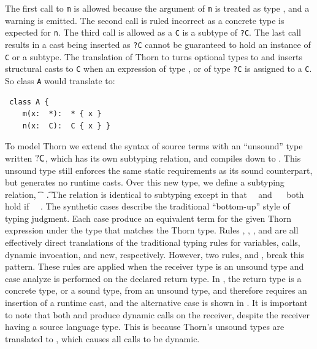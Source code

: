 \documentclass[acmlarge, anonymous, authordraft]{acmart}
\newcommand{\code}[1]{{\tt #1}\xspace}
\begin{document}
\noindent The first call to \code m is allowed because the argument of \code m
is treated as type \any, and a warning is emitted. The second call is ruled
incorrect as a concrete type is expected for \code n. The third call is allowed
as a \code C is a subtype of \code{?C}. The last call results in a cast being
inserted as \code{?C} cannot be guaranteed to hold an instance of \code{C} or a
subtype.  The translation of Thorn to \kafka turns optional types to \any and
inserts structural casts to \code{C} when an expression of type \any, or of type
\code{?C} is assigned to a \code{C}. So class \code A would translate to:

\begin{lstlisting}
 class A {
    m(x:  *):  * { x }
    n(x:  C):  C { x } }
\end{lstlisting}


To model Thorn we extend the syntax of source terms with an ``unsound'' type
written ${\sf{?}}{\sf{C}}$, which has its own subtyping relation, and compiles down to
\any. This unsound type still enforces the same static requirements as its
sound counterpart, but generates no runtime casts.  Over this new type, we
define a subtyping relation, \t~\src\Sub~\t. The relation is identical to
\kafka subtyping except in that \dt\C~\src\Sub~\dt\D and \C~\src\Sub~\dt\D
both hold if \C~\src\Sub~\D.  The synthetic cases describe the traditional
``bottom-up'' style of typing judgment. Each case produce an equivalent
\kafka term for the given Thorn expression under the \kafka type that
matches the Thorn type. Rules , ,
, and  are all effectively direct translations
of the traditional typing rules for variables, calls, dynamic invocation,
and new, respectively.  However, two rules,  and
, break this pattern. These rules are applied when the
receiver type is an unsound type and case analyze is performed on the
declared return type. In , the return type is a concrete type,
or a sound type, from an unsound type, and therefore requires an insertion
of a runtime cast, and the alternative case is shown in . It
is important to note that both  and  produce
dynamic calls on the receiver, despite the receiver having a source language
type. This is because Thorn's unsound types are translated to \any, which
causes all calls to be dynamic.
\end{document}

